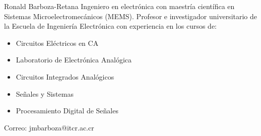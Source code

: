 \documentclass[journal]{IEEEtran}
\begin{document}
\begin{IEEEbiographynophoto}{Ronald Barboza-Retana}
Ingeniero en electrónica con maestría científica en Sistemas Microelectromecánicos (MEMS). Profesor e investigador universitario de la Escuela de Ingeniería Electrónica con experiencia en los cursos de:

\begin{itemize}
\item Circuitos Eléctricos en CA
\item Laboratorio de Electrónica Analógica
\item Circuitos Integrados Analógicos
\item Señales y Sistemas
\item Procesamiento Digital de Señales
\end{itemize} 

Correo: jmbarboza@itcr.ac.cr
\end{IEEEbiographynophoto}

\vfill
\end{document}

